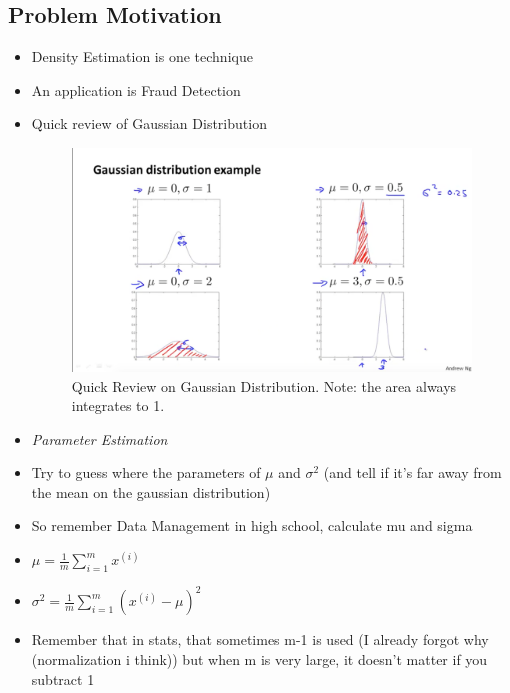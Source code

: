 \documentclass[]{article}
\begin{document}
	\subsection{Problem Motivation}
		\begin{itemize}
			\item Density Estimation is one technique
			\item An application is Fraud Detection
			\item Quick review of Gaussian Distribution
			\begin{figure}[ht!]
				\includegraphics[width= 1.5\textwidth,center]{Gaussian_Review.png}
				\caption{Quick Review on Gaussian Distribution. Note: the area always integrates to 1.}
			\end{figure}
			\item \emph{Parameter Estimation}
			\item Try to guess where the parameters of $\mu$ and $\sigma^2$ (and tell if it's far away from the mean on the gaussian distribution)
			\item So remember Data Management in high school, calculate mu and sigma
			\item $\mu = \frac{1}{m} \sum\limits_{i=1}^{m} x^{(i)}$
			\item $\sigma^2 = \frac{1}{m}\sum\limits_{i=1}^{m} (x^{(i)}-\mu)^2$
			\item Remember that in stats, that sometimes m-1 is used (I already forgot why (normalization i think)) but when m is very large, it doesn't matter if you subtract 1
		\end{itemize}
		
\end{document}
